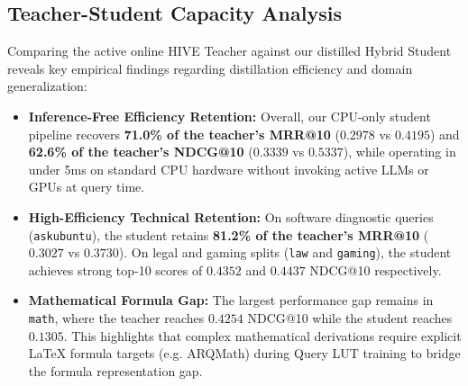 \documentclass[11pt,a4paper]{article}
\begin{document}
\subsection{Teacher-Student Capacity Analysis}
Comparing the active online HIVE Teacher against our distilled Hybrid Student reveals key empirical findings regarding distillation efficiency and domain generalization:
\begin{itemize}
    \item \textbf{Inference-Free Efficiency Retention:} Overall, our CPU-only student pipeline recovers \textbf{71.0\% of the teacher's MRR@10} ($0.2978$ vs $0.4195$) and \textbf{62.6\% of the teacher's NDCG@10} ($0.3339$ vs $0.5337$), while operating in under 5ms on standard CPU hardware without invoking active LLMs or GPUs at query time.
    \item \textbf{High-Efficiency Technical Retention:} On software diagnostic queries (\texttt{askubuntu}), the student retains \textbf{81.2\% of the teacher's MRR@10} ($0.3027$ vs $0.3730$). On legal and gaming splits (\texttt{law} and \texttt{gaming}), the student achieves strong top-10 scores of $0.4352$ and $0.4437$ NDCG@10 respectively.
    \item \textbf{Mathematical Formula Gap:} The largest performance gap remains in \texttt{math}, where the teacher reaches $0.4254$ NDCG@10 while the student reaches $0.1305$. This highlights that complex mathematical derivations require explicit LaTeX formula targets (e.g. ARQMath) during Query LUT training to bridge the formula representation gap.
\end{itemize}



\end{document}
